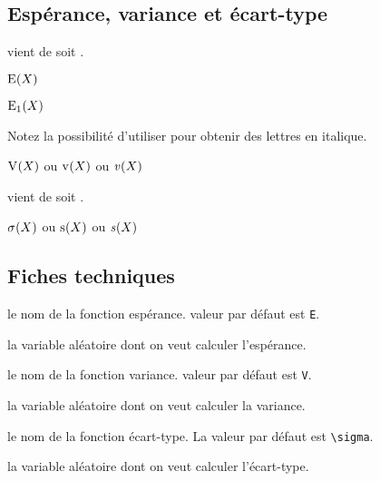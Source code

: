 \documentclass[12pt,a4paper]{article}
\begin{document}

\subsection{Espérance, variance et écart-type}


 vient de   soit .
\begin{latexex}
$\expval{X}$
\end{latexex}





\begin{latexex}
$\expval[E_1]{X}$
\end{latexex}





Notez la possibilité d'utiliser  pour obtenir des lettres en italique.

\begin{latexex}
$\var   {X}$ ou
$\var[v]{X}$ ou
$\var[\mathit{v}]{X}$
\end{latexex}





 vient de   soit .

\begin{latexex}
$\stddev   {X}$ ou
$\stddev[s]{X}$ ou
$\stddev[\mathit{s}]{X}$
\end{latexex}




\subsection{Fiches techniques}


\IDoption{} le nom de la fonction espérance. valeur par défaut est \verb#E#.

\IDarg{} la variable aléatoire dont on veut calculer l'espérance.


\separation



\IDoption{} le nom de la fonction variance. valeur par défaut est \verb#V#.

\IDarg{} la variable aléatoire dont on veut calculer la variance.


\separation



\IDoption{} le nom de la fonction écart-type. La valeur par défaut est \verb#\sigma#.

\IDarg{} la variable aléatoire dont on veut calculer l'écart-type.
\end{document}
